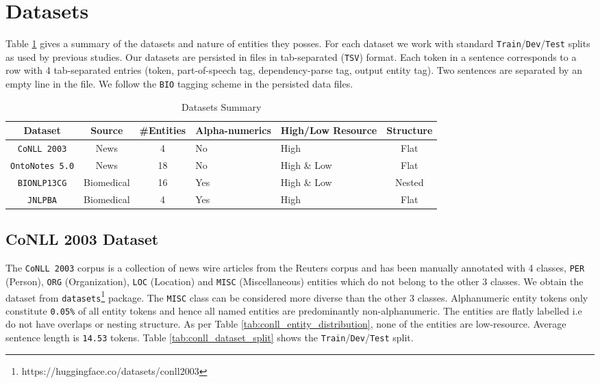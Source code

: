 \section{Datasets}

Table \ref{tab:datasets_summary} gives a summary of the datasets and nature of entities they posses. For each dataset we work with standard \texttt{Train}/\texttt{Dev}/\texttt{Test} splits as used by previous studies. Our datasets are persisted in files in tab-separated (\texttt{TSV}) format. Each token in a sentence corresponds to a row with 4 tab-separated entries (token, part-of-speech tag, dependency-parse tag, output entity tag). Two sentences are separated by an empty line in the file. We follow the \texttt{BIO} tagging scheme in the persisted data files.

\begin{table}[h!]
	\begin{tabular}{|c|c|c|p{5em}|p{6em}|c|}\hline
	\textbf{Dataset} & \textbf{Source} & \textbf{\#Entities} & \textbf{Alpha-numerics} & \textbf{High/Low Resource} & \textbf{Structure}\\\hline
	\texttt{CoNLL 2003} & News & 4 & No & High & Flat\\\hline
	\texttt{OntoNotes 5.0} & News & 18 & No & High \& Low & Flat\\\hline
	\texttt{BIONLP13CG} & Biomedical & 16 & Yes & High \& Low & Nested\\\hline
	\texttt{JNLPBA} & Biomedical & 4 & Yes & High & Flat\\\hline
	\end{tabular}
	\caption{Datasets Summary}
	\label{tab:datasets_summary}
\end{table}

\subsection{CoNLL 2003 Dataset}

The \texttt{CoNLL 2003}\cite{sang2003introduction} corpus is a collection of news wire articles from the Reuters corpus and has been manually annotated with 4 classes, \texttt{PER} (Person), \texttt{ORG} (Organization), \texttt{LOC} (Location) and \texttt{MISC} (Miscellaneous) entities which do not belong to the other 3 classes. We obtain the dataset from \texttt{datasets}\footnote{https://huggingface.co/datasets/conll2003} package. The \texttt{MISC} class can be considered more diverse than the other 3 classes. Alphanumeric entity tokens only constitute \texttt{0.05\%} of all entity tokens and hence all named entities are predominantly non-alphanumeric. The entities are flatly labelled i.e do not have overlaps or nesting structure. As per Table \ref{tab:conll_entity_distribution}, none of the entities are low-resource. Average sentence length is \texttt{14.53} tokens. Table \ref{tab:conll_dataset_split} shows the \texttt{Train}/\texttt{Dev}/\texttt{Test} split. 

